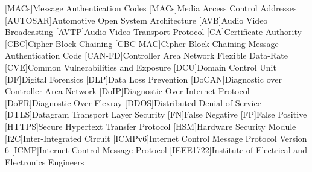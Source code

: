 %
\begin{acronym}
[MACs]{Message Authentication Codes}	%
[MACs]{Media Access Control Addresses}	%
[AUTOSAR]{Automotive Open System Architecture}    %
[AVB]{Audio Video Broadcasting}
[AVTP]{Audio Video Transport Protocol}
[CA]{Certificate Authority}
[CBC]{Cipher Block Chaining}    %
[CBC-MAC]{Cipher Block Chaining Message Authentication Code}    %
[CAN-FD]{Controller Area Network Flexible Data-Rate}
[CVE]{Common Vulnerabilities and Exposure}
[DCU]{Domain Control Unit}
[DF]{Digital Forensics}
[DLP]{Data Loss Prevention}
[DoCAN]{Diagnostic over Controller Area Network}
[DoIP]{Diagnostic Over Internet Protocol}
[DoFR]{Diagnostic Over Flexray}
[DDOS]{Distributed Denial of Service}
[DTLS]{Datagram Transport Layer Security}
[FN]{False Negative}
[FP]{False Positive}
[HTTPS]{Secure Hypertext Transfer Protocol }
[HSM]{Hardware Security Module}
[I2C]{Inter-Integrated Circuit}
[ICMPv6]{Internet Control Message Protocol Version 6}
[ICMP]{Internet Control Message Protocol}
[IEEE1722]{Institute of Electrical and Electronics Engineers}

\end{acronym}
